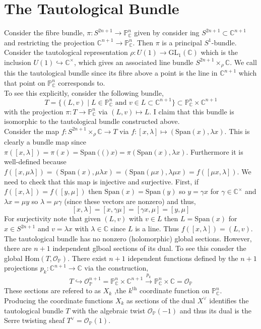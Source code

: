 \documentclass[12]{article}
\begin{document}
\section{The Tautological Bundle}

\newcommand{\C}{\mathbb{C}}
\renewcommand{\P}{\mathbb{P}}
\newcommand{\embed}{\hookrightarrow}
\newcommand{\Span}[1]{\mathrm{Span}\left( #1 \right)}

Consider the fibre bundle, $\pi : S^{2 n + 1} \to \P^n_{\C}$ given by consider ing $S^{2n +1} \subset \C^{n+1}$ and restricting the projection $\C^{n+1} \to \P^n_\C$. Then $\pi$ is a principal $S^1$-bundle. Consider the tautological representation $\rho : U(1) \to \mathrm{GL}_1(\C)$ which is the inclusion $U(1) \embed \C^\times$, which gives an associated line bundle $S^{2 n + 1} \times_\rho \C$. We call this the tautological bundle since its fibre above a point is the line in $\C^{n+1}$ which that point on $\P^n_\C$ corresponds to.
\bigskip\\
To see this explicitly, consider the following bundle,
\[ T = \{ (L, v) \mid L \in \P^n_\C \textrm{ and } v \in L \subset \C^{n+1} \} \subset \P^n_\C \times \C^{n+1} \]
with the projection $\pi : T \to \P^n_\C$ via $(L, v) \mapsto L$. I claim that this bundle is isomorphic to the tautological bundle constructed above. 
\bigskip\\
Consider the map $f : S^{2n + 1} \times_\rho \C \to T$ via $f : [x, \lambda] \mapsto ( \mathrm{Span}(x), \lambda x)$. This is clearly a bundle map since $\pi([x, \lambda]) = \pi(x) = \Span(x) = \pi(\Span{x}, \lambda x)$. Furthermore it is well-defined because $f([x, \mu \lambda]) = (\Span{x}, \mu \lambda x) = (\Span{\mu x}, \lambda \mu x) = f([\mu x, \lambda])$. We need to check that this map is injective and surjective. First, if $f([x, \lambda]) = f([y, \mu])$ then $\Span{x} = \Span{y}$ so $y = \gamma x$ for $\gamma \in \C^\times$ and $\lambda x = \mu y$ so $\lambda = \mu \gamma$ (since these vectors are nonzero) and thus,
\[ [x, \lambda] = [x, \gamma \mu] = [\gamma x, \mu] = [y, \mu] \]
For surjectivity note that given $(L, v)$ with $v \in L$ then $L = \Span{x}$ for $x \in S^{2n + 1}$ and $v = \lambda x$ with $\lambda \in \C$ since $L$ is a line. Thus $f([x, \lambda]) = (L, v)$. 
\bigskip\\
The tautological bundle has no nonzero (holomorphic) global sections.   However, there are $n+1$ independent glboal sections of its dual. To see this consder the global $\mathrm{Hom}(T, \mathcal{O}_\P)$. There exist $n+1$ idependent functions defined by the $n+1$ projections $p_k : \C^{n+1} \to \C$ via the construction, 
\[ T \embed \mathcal{O}^{n+1}_\P = \P^n_\C \times \C^{n+1} \xrightarrow{p_k} \P^n_\C \times \C = \mathcal{O}_\P \]
These sections are refered to as $X_k$ ,the $k^{\mathrm{th}}$ coordinate function on $\P^n_\C$.
\bigskip\\
Producing the coordinate functions $X_k$ as sections of the dual $X^\vee$ identifies the tautological bundle $T$ with the algebraic twist $\mathcal{O}_\P(-1)$ and thus its dual is the Serre twisting sheaf $T^\vee = \mathcal{O}_\P(1)$. 
\end{document}
